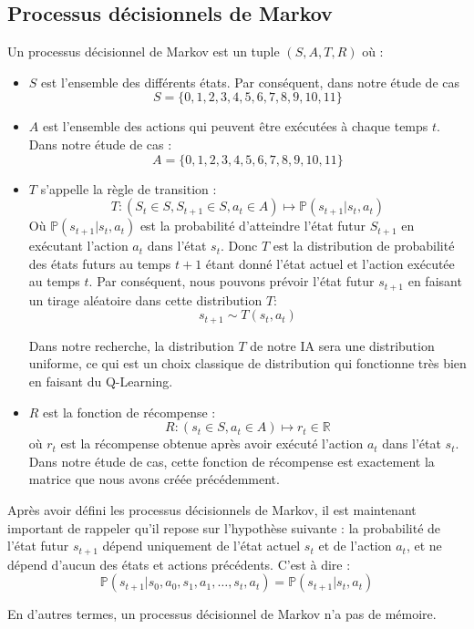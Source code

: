 \documentclass{article}
\begin{document}
\subsection{Processus décisionnels de Markov}
Un processus décisionnel de Markov est un tuple $(S, A, T, R)$ où :
\begin{itemize}
    \item $S$ est l'ensemble des différents états. Par conséquent, dans notre étude de cas 
    $$S=\{0,1,2,3,4,5,6,7,8,9,10,11\}$$
    
    \item $A$ est l'ensemble des actions qui peuvent être exécutées à chaque temps $t$. Dans notre étude de cas :
    $$A=\{0,1,2,3,4,5,6,7,8,9,10,11\}$$
    
    \item $T$ s'appelle la règle de transition :
    $$T: (S_t \in S, S_{t+1} \in S, a_t \in A) \longmapsto \mathbb{P}(s_{t+1} | s_t, a_t)$$
    Où $\mathbb{P}(s_{t+1} | s_t, a_t)$ est la probabilité d'atteindre l'état futur $S_{t+1}$ en exécutant l'action $a_t$ dans l'état $s_t$. Donc $T$ est la distribution de probabilité des états futurs au temps $t+1$ étant donné l'état actuel et l'action exécutée au temps $t$. Par conséquent, nous pouvons prévoir l'état futur $s_{t+1}$ en faisant un tirage aléatoire dans cette distribution $T$:
    $$s_{t+1} \sim T(s_t, a_t)$$
    
    Dans notre recherche, la distribution $T$ de notre IA sera une distribution uniforme, ce qui est un choix classique de distribution qui fonctionne très bien en faisant du Q-Learning.
    
    \item $R$ est la fonction de récompense :
    $$R: (s_t \in S, a_t \in A) \longmapsto r_t \in \mathbb{R}$$
    où $r_t$ est la récompense obtenue après avoir exécuté l'action $a_t$ dans l'état $s_t$. Dans notre étude de cas, cette fonction de récompense est exactement la matrice que nous avons créée précédemment.
\end{itemize}

Après avoir défini les processus décisionnels de Markov, il est maintenant important de rappeler qu'il repose sur l'hypothèse suivante : la probabilité de l'état futur $s_{t+1}$ dépend uniquement de l'état actuel $s_t$ et de l'action $a_t$, et ne dépend d'aucun des états et actions précédents. C'est à dire :
$$\mathbb{P}(s_{t+1} | s_0, a_0, s_1, a_1, \dots, s_t, a_t) = \mathbb{P}(s_{t+1} | s_t, a_t)$$

En d'autres termes, un processus décisionnel de Markov n'a pas de mémoire.
\end{document}

